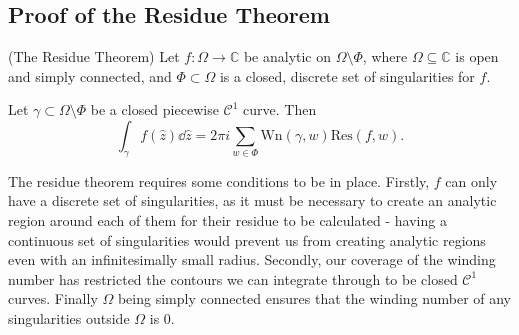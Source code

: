 \documentclass[a4paper]{article}
\def\Res{\text{Res}}
\def\Wind{\text{Wn}}
\begin{document}
\subsection{Proof of the Residue Theorem}
\begin{theorem}{(The Residue Theorem) \citep[p.133-134]{Bak}}{} \label{thm:resthm}
Let $f: \Omega \rightarrow \mathbb{C}$ be analytic on $\Omega \setminus \Phi$, where $\Omega \subseteq \mathbb{C}$  is open and simply connected, and $\Phi \subset \Omega$ is a closed, discrete set of singularities for $f$.


Let $\gamma \subset \Omega \setminus \Phi$ be a closed piecewise $\mathcal{C}^{1}$ curve. Then 
\[ \int_\gamma { f(\hat{z}) \dd\hat{z}} = 2 \pi i \sum_{w \in \Phi} \Wind (\gamma,w) \Res (f,w). \]

\end{theorem}

The residue theorem requires some conditions to be in place. Firstly, $f$ can only have a discrete set of singularities, as it must be necessary to create an analytic region around each of them for their residue to be calculated - having a continuous set of singularities would prevent us from creating analytic regions even with an infinitesimally small radius. Secondly, our coverage of the winding number has restricted the contours we can integrate through to be closed $\mathcal{C}^{1}$ curves. Finally $\Omega$ being simply connected ensures that the winding number of any singularities outside $\Omega$ is $0$.
\end{document}

